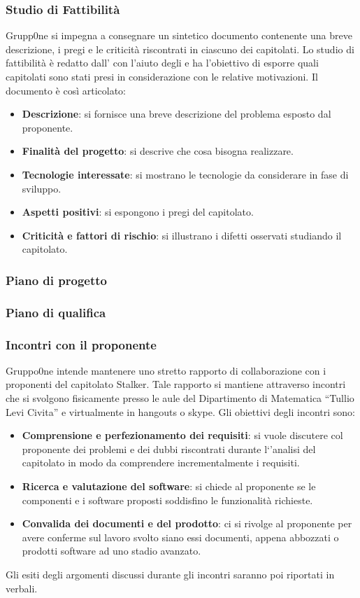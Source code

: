 \documentclass[../norme-di-progetto.tex]{subfiles}
\begin{document}
\subsubsection{Studio di Fattibilità}
\label{par:studio di fattibilità}
Grupp0ne si impegna a consegnare un sintetico documento contenente una breve descrizione, i pregi e le criticità riscontrati in ciascuno dei capitolati. Lo studio di fattibilità è redatto dall'
con l'aiuto degli  e ha l'obiettivo di esporre quali capitolati sono stati presi in considerazione con le relative motivazioni. Il documento è così articolato:
\begin{itemize}
\item \textbf{Descrizione}: si fornisce una breve descrizione del problema esposto dal proponente.
\item \textbf{Finalità del progetto}: si descrive che cosa bisogna realizzare.
\item \textbf{Tecnologie interessate}: si mostrano le tecnologie da considerare in fase di sviluppo.
\item \textbf{Aspetti positivi}: si espongono i pregi del capitolato.
\item \textbf{Criticità e fattori di rischio}: si illustrano i difetti osservati studiando il capitolato.
\end{itemize}
\subsubsection{Piano di progetto}
\label{par:piano di progetto}
\subsubsection{Piano di qualifica}
\label{par:piano di qualifica}
\subsubsection{Incontri con il proponente}
\label{subs:incontri con il proponente}
Gruppo0ne intende mantenere uno stretto rapporto di collaborazione con i proponenti del capitolato Stalker. Tale rapporto si mantiene attraverso incontri che si svolgono fisicamente presso le aule del Dipartimento di Matematica ``Tullio Levi Civita'' e virtualmente in hangouts o skype.
Gli obiettivi degli incontri sono:
\begin{itemize}
\item \textbf{Comprensione e perfezionamento dei requisiti}: si vuole discutere col proponente dei problemi e dei dubbi riscontrati durante l`'analisi del capitolato in modo da comprendere incrementalmente i requisiti.
\item \textbf{Ricerca e valutazione del software}: si chiede al proponente se le componenti e i software proposti soddisfino le funzionalità richieste.
\item \textbf{Convalida dei documenti e del prodotto}: ci si rivolge al proponente per avere conferme sul lavoro svolto siano essi documenti,  appena abbozzati o prodotti software ad uno stadio avanzato.
\end{itemize}
Gli esiti degli argomenti discussi durante gli incontri saranno poi riportati in verbali.
\end{document}
